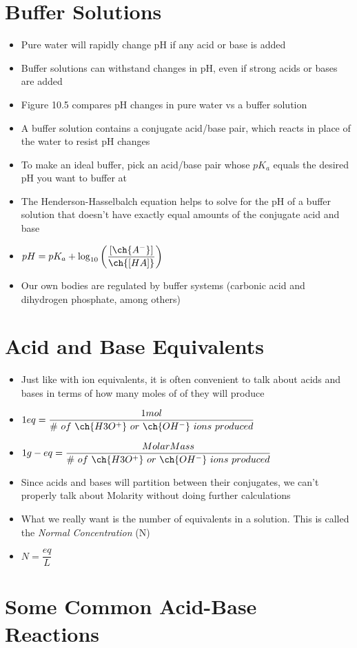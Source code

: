\documentclass[12pt, openany, letterpaper]{memoir}
\begin{document}
\section{Buffer Solutions}
\begin{itemize}
	\item Pure water will rapidly change pH if any acid or base is added
	\item Buffer solutions can withstand changes in pH, even if strong acids or bases are added
	\item Figure 10.5 compares pH changes in pure water vs a buffer solution
	\item A buffer solution contains a conjugate acid/base pair, which reacts in place of the water to resist pH changes
	\item To make an ideal buffer, pick an acid/base pair whose $pK_a$ equals the desired pH you want to buffer at
	\item The Henderson-Hasselbalch equation helps to solve for the pH of a buffer solution that doesn't have exactly equal amounts of the conjugate acid and base
	\item $pH=pK_a + \log_{10}\left(\dfrac{[\ch{A^-}]}{\ch{[HA]}}\right)$
	\item Our own bodies are regulated by buffer systems (carbonic acid and dihydrogen phosphate, among others)
\end{itemize}
\section{Acid and Base Equivalents}
\begin{itemize}
	\item Just like with ion equivalents, it is often convenient to talk about acids and bases in terms of how many moles of  of  they will produce
	\item $1eq = \dfrac{1mol}{\#~of~\ch{H3O^+}~or~\ch{OH^-}~ions~produced}$
	\item $1g-eq = \dfrac{Molar Mass}{\#~of~\ch{H3O^+}~or~\ch{OH^-}~ions~produced}$
	\item Since acids and bases will partition between their conjugates, we can't properly talk about Molarity without doing further calculations
	\item What we really want is the number of equivalents in a solution. This is called the \emph{Normal Concentration} (N)
	\item $N=\dfrac{eq}{L}$
\end{itemize}
\section{Some Common Acid-Base Reactions}
\end{document}
